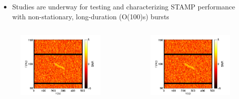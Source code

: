 \documentclass{beamer}
\begin{document}
\begin{frame}
    \begin{itemize}
        \item Studies are underway for testing and characterizing \textsc{STAMP}
            performance with non-stationary, long-duration (O(100)s) bursts
    \end{itemize}

    \begin{columns}[]
        \begin{center}
        \begin{figure}
            \vspace*{-0.5cm}
            \includegraphics[scale=0.3]{qpo_tf.png} 
        \end{figure}
        \end{center}

        \begin{center}
        \begin{figure}
            \vspace*{-0.5cm}
            \includegraphics[scale=0.3]{qpo_tf.png} 
        \end{figure}
        \end{center}
    \end{columns}

\end{frame}
\end{document}
